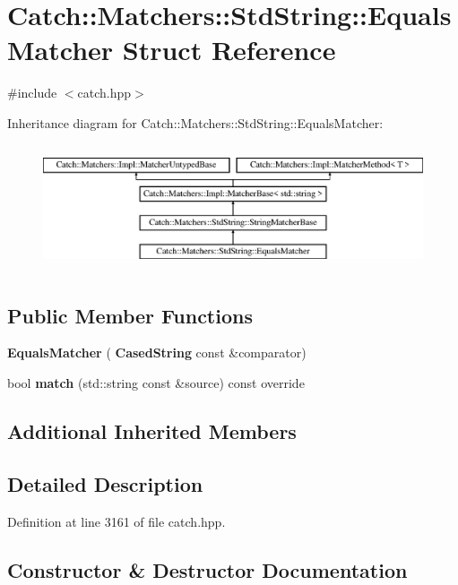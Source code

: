 \section{Catch\+::Matchers\+::Std\+String\+::Equals\+Matcher Struct Reference}
\label{struct_catch_1_1_matchers_1_1_std_string_1_1_equals_matcher}


{\ttfamily \#include $<$catch.\+hpp$>$}

Inheritance diagram for Catch\+::Matchers\+::Std\+String\+::Equals\+Matcher\+:\begin{figure}[H]
\begin{center}
\leavevmode
\includegraphics[height=3.758389cm]{struct_catch_1_1_matchers_1_1_std_string_1_1_equals_matcher}
\end{center}
\end{figure}
\subsection*{Public Member Functions}
\begin{DoxyCompactItemize}
\item 
\textbf{ Equals\+Matcher} (\textbf{ Cased\+String} const \&comparator)
\item 
bool \textbf{ match} (std\+::string const \&source) const override
\end{DoxyCompactItemize}
\subsection*{Additional Inherited Members}


\subsection{Detailed Description}


Definition at line 3161 of file catch.\+hpp.



\subsection{Constructor \& Destructor Documentation}
\mbox{\label{struct_catch_1_1_matchers_1_1_std_string_1_1_equals_matcher_ab740f1fb2310e9fe3fed5134d4c7e4c8}} 
